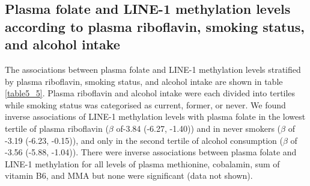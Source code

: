\subsection{Plasma folate and LINE-1 methylation levels according to plasma riboflavin, smoking status, and alcohol intake} %
\noindent The associations between plasma folate and LINE-1 methylation levels stratified by plasma riboflavin, smoking status, and alcohol intake are shown in table \ref{table5_5}. Plasma riboflavin and alcohol intake were each divided into tertiles while smoking status was categorised as current, former, or never. We found inverse associations of LINE-1 methylation levels with plasma folate in the lowest tertile of plasma riboflavin ($\beta$ of-3.84 (-6.27, -1.40)) and in never smokers ($\beta$ of -3.19 (-6.23, -0.15)), and only in the second tertile of alcohol consumption ($\beta$ of -3.56 (-5.88, -1.04)). There were inverse associations between plasma folate and LINE-1 methylation for all levels of plasma methionine, cobalamin, sum of vitamin B6, and MMA but none were significant (data not shown).


